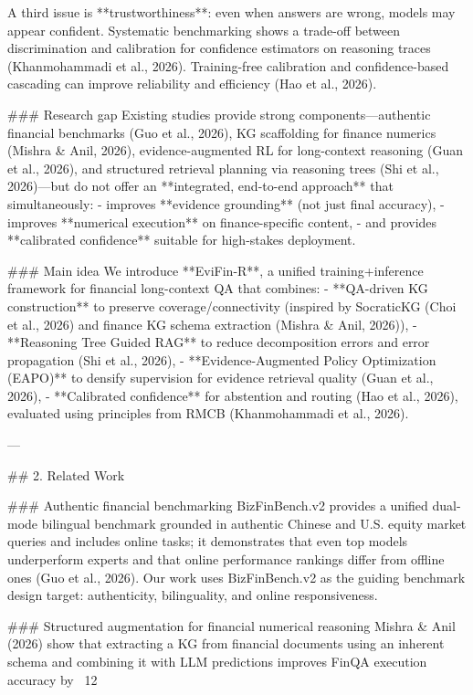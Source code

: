 A third issue is **trustworthiness**: even when answers are wrong, models may appear confident. Systematic benchmarking shows a trade-off between discrimination and calibration for confidence estimators on reasoning traces (Khanmohammadi et al., 2026). Training-free calibration and confidence-based cascading can improve reliability and efficiency (Hao et al., 2026).

### Research gap  
Existing studies provide strong components—authentic financial benchmarks (Guo et al., 2026), KG scaffolding for finance numerics (Mishra & Anil, 2026), evidence-augmented RL for long-context reasoning (Guan et al., 2026), and structured retrieval planning via reasoning trees (Shi et al., 2026)—but do not offer an **integrated, end-to-end approach** that simultaneously:
- improves **evidence grounding** (not just final accuracy),
- improves **numerical execution** on finance-specific content,
- and provides **calibrated confidence** suitable for high-stakes deployment.

### Main idea  
We introduce **EviFin-R**, a unified training+inference framework for financial long-context QA that combines:
- **QA-driven KG construction** to preserve coverage/connectivity (inspired by SocraticKG (Choi et al., 2026) and finance KG schema extraction (Mishra & Anil, 2026)),
- **Reasoning Tree Guided RAG** to reduce decomposition errors and error propagation (Shi et al., 2026),
- **Evidence-Augmented Policy Optimization (EAPO)** to densify supervision for evidence retrieval quality (Guan et al., 2026),
- **Calibrated confidence** for abstention and routing (Hao et al., 2026), evaluated using principles from RMCB (Khanmohammadi et al., 2026).

---

## 2. Related Work  

### Authentic financial benchmarking  
BizFinBench.v2 provides a unified dual-mode bilingual benchmark grounded in authentic Chinese and U.S. equity market queries and includes online tasks; it demonstrates that even top models underperform experts and that online performance rankings differ from offline ones (Guo et al., 2026). Our work uses BizFinBench.v2 as the guiding benchmark design target: authenticity, bilinguality, and online responsiveness.

### Structured augmentation for financial numerical reasoning  
Mishra & Anil (2026) show that extracting a KG from financial documents using an inherent schema and combining it with LLM predictions improves FinQA execution accuracy by ~12%

